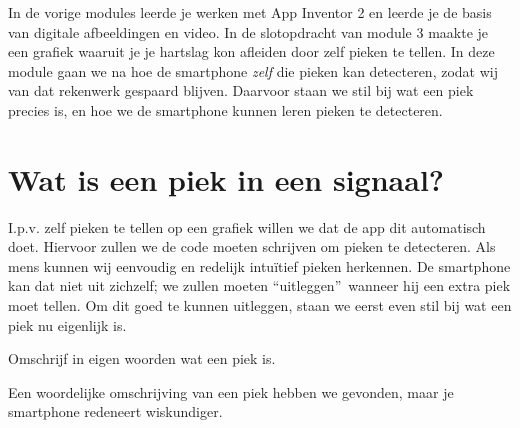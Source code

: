 \label{sec:piekdetectie}

\begin{samenvatting}
	In de vorige modules leerde je werken met App Inventor 2 en leerde je de basis van digitale afbeeldingen en video. In de slotopdracht van module 3 maakte je een grafiek waaruit je je hartslag kon afleiden door zelf pieken te tellen. In deze module gaan we na hoe de smartphone \emph{zelf} die pieken kan detecteren, zodat wij van dat rekenwerk gespaard blijven. Daarvoor staan we stil bij wat een piek precies is, en hoe we de smartphone kunnen leren pieken te detecteren. 
\end{samenvatting}
%

\section{Wat is een piek in een signaal?}
\label{sec:Mod4_Sec1}
%
I.p.v. zelf pieken te tellen op een grafiek willen we dat de app dit automatisch doet. Hiervoor zullen we de code moeten schrijven om pieken te detecteren. Als mens kunnen wij eenvoudig en redelijk intu\"itief pieken herkennen. De smartphone kan dat niet uit zichzelf; we zullen moeten \textquotedblleft uitleggen\textquotedblright \ wanneer hij een extra piek moet tellen. Om dit goed te kunnen uitleggen, staan we eerst even stil bij wat een piek nu eigenlijk is.

\begin{steroef}
	Omschrijf in eigen woorden wat een piek is.
\end{steroef}

Een woordelijke omschrijving van een piek hebben we gevonden, maar je smartphone redeneert wiskundiger. 

